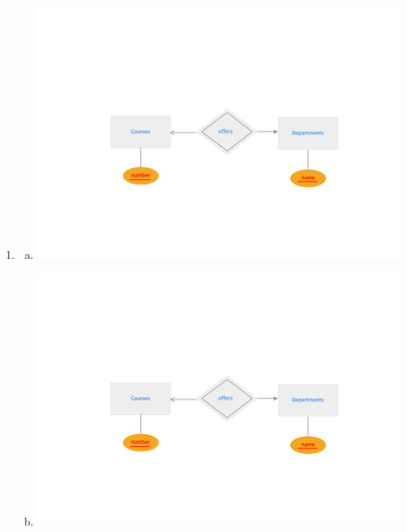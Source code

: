 \documentclass[12pt]{article}
\begin{document}
\begin{enumerate}[1.]
\begin{enumerate}[a)]
\begin{mdframed}
        \end{mdframed}

    \end{enumerate}


    \item

    \begin{enumerate}[a)]

        \item

        \begin{center}
        \includegraphics[width=\linewidth]{images/worksheet_14_solution_67.png}
        \end{center}

        \item

        \begin{center}
        \includegraphics[width=\linewidth]{images/worksheet_14_solution_67.png}
        \end{center}


\end{enumerate}
\end{enumerate}
\end{document}
